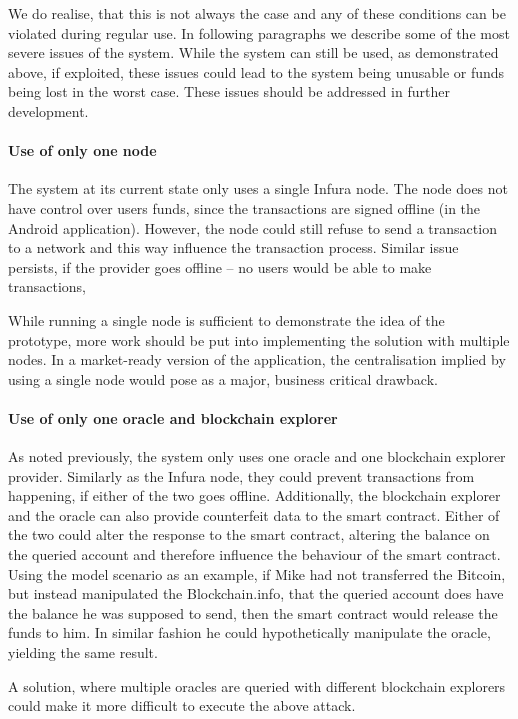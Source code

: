 We do realise, that this is not always the case and any of these conditions can be violated during regular use. In following paragraphs we describe some of the most severe issues of the system. While the system can still be used, as demonstrated above, if exploited, these issues could lead to the system being unusable or funds being lost in the worst case. These issues should be addressed in further development.

\paragraph{Use of only one node}
The system at its current state only uses a single Infura node. The node does not have control over users funds, since the transactions are signed offline (in the Android application). However, the node could still refuse to send a transaction to a network and this way influence the transaction process. Similar issue persists, if the provider goes offline -- no users would be able to make transactions,

While running a single node is sufficient to demonstrate the idea of the prototype, more work should be put into implementing the solution with multiple nodes. In a market-ready version of the application, the centralisation implied by using a single node would pose as a major, business critical drawback.
% 
\paragraph{Use of only one oracle and blockchain explorer}
As noted previously, the system only uses one oracle and one blockchain explorer provider. Similarly as the Infura node, they could prevent transactions from happening, if either of the two goes offline. Additionally, the blockchain explorer and the oracle can also provide counterfeit data to the smart contract. Either of the two could alter the response to the smart contract, altering the balance on the queried account and therefore influence the behaviour of the smart contract. Using the model scenario as an example, if Mike had not transferred the Bitcoin, but instead manipulated the Blockchain.info, that the queried account does have the balance he was supposed to send, then the smart contract would release the funds to him. In similar fashion he could hypothetically manipulate the oracle, yielding the same result.

A solution, where multiple oracles are queried with different blockchain explorers could make it more difficult to execute the above attack.
% 

